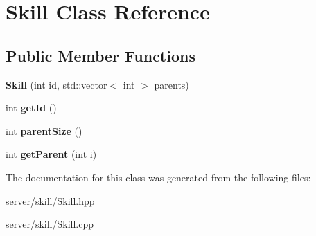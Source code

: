 \hypertarget{class_skill}{\section{Skill Class Reference}
\label{class_skill}
}
\subsection*{Public Member Functions}
\begin{DoxyCompactItemize}
\item 
\hypertarget{class_skill_a082145bb41f77037c89725c6a91114a6}{{\bfseries Skill} (int id, std\-::vector$<$ int $>$ parents)}\label{class_skill_a082145bb41f77037c89725c6a91114a6}

\item 
\hypertarget{class_skill_af106ad900f6b80ba5af692c602a7f145}{int {\bfseries get\-Id} ()}\label{class_skill_af106ad900f6b80ba5af692c602a7f145}

\item 
\hypertarget{class_skill_a82f6c65930228e13a4942e7240334615}{int {\bfseries parent\-Size} ()}\label{class_skill_a82f6c65930228e13a4942e7240334615}

\item 
\hypertarget{class_skill_a7deaa57f569a910e5e89445aa3babb4a}{int {\bfseries get\-Parent} (int i)}\label{class_skill_a7deaa57f569a910e5e89445aa3babb4a}

\end{DoxyCompactItemize}


The documentation for this class was generated from the following files\-:\begin{DoxyCompactItemize}
\item 
server/skill/Skill.\-hpp\item 
server/skill/Skill.\-cpp\end{DoxyCompactItemize}
